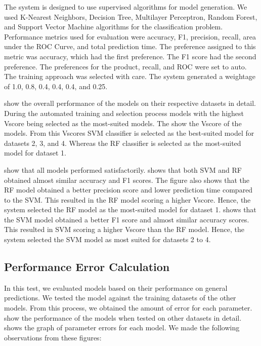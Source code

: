 \documentclass[a4paper,fleqn]{cas-dc}
\newcommand{\responsemod}{\color{blue}}
\begin{document}
{\responsemod
    The system is designed to use supervised algorithms for model generation. We used K-Nearest Neighbors, Decision Tree, Multilayer Perceptron, Random Forest, and Support Vector Machine algorithms for the classification problem. Performance metrics used for evaluation were accuracy, F1, precision, recall, area under the ROC Curve, and total prediction time. The preference assigned to this metric was accuracy, which had the first preference. The F1 score had the second preference. The preferences for the product, recall, and ROC were set to auto. The training approach was selected with care. The system generated a weightage of 1.0, 0.8, 0.4, 0.4, 0.4, and 0.25.

     show the overall performance of the models on their respective datasets in detail. During the automated training and selection process models with the highest Vscore being selected as the most-suited models. The  show the Vscore of the models. From this Vscores SVM classifier is selected as the best-suited model for datasets 2, 3, and 4. Whereas the RF classifier is selected as the most-suited model for dataset 1.

     show that all models performed satisfactorily.  shows that both SVM and RF obtained almost similar accuracy and F1 scores. The figure also shows that the RF model obtained a better precision score and lower prediction time compared to the SVM. This resulted in the RF model scoring a higher Vscore. Hence, the system selected the RF model as the most-suited model for dataset 1.  shows that the SVM model obtained a better F1 score and almost similar accuracy scores. This resulted in SVM scoring a higher Vscore than the RF model. Hence, the system selected the SVM model as most suited for datasets 2 to 4.

    \subsection{Performance Error Calculation}

    In this test, we evaluated models based on their performance on general predictions. We tested the model against the training datasets of the other models. From this process, we obtained the amount of error for each parameter.    show the performance of the models when tested on other datasets in detail.  shows the graph of parameter errors for each model. We made the following observations from these figures:


}
\end{document}

